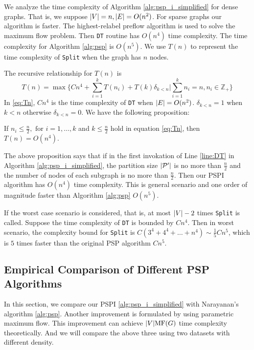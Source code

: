 We analyze the time complexity of Algorithm \ref{alg:psp_i_simplified} for dense graphs. That is, we suppose $\lvert V\rvert = n, \lvert E\rvert = O(n^2)$. For sparse graphs our algorithm is faster. The highest-relabel preflow algorithm is used to solve the maximum flow problem. Then \texttt{DT} routine has $O(n^4)$ time complexity. The time complexity for Algorithm \ref{alg:psp} is $O(n^5)$.
We use $T(n)$ to represent the time complexity of \texttt{Split} when the graph has $n$ nodes.

The recursive relationship for $T(n)$ is
\begin{equation}\label{eq:Tn}
T(n) = \max \{ C n^4 + \sum_{i=1}^k T(n_i) + T(k)\delta_{k<n} | \sum_{i=1}^k n_i = n, n_i \in \mathbb{Z}_{+} \}
\end{equation}	
In \eqref{eq:Tn}, $Cn^4$ is the time complexity of \texttt{DT} when $\lvert E\rvert = O(n^2)$. $\delta_{k<n} = 1$ when $k<n$ otherwise $\delta_{k<n}=0$. We have the following proposition:
\begin{proposition}\label{prop:alg_complexity}
	 If $n_i \leq \frac{n}{2}, \textrm{ for } i=1,\dots,k$ and $ k \leq \frac{n}{2}$  hold in equation \eqref{eq:Tn}, then $T(n) = O(n^4)$.
\end{proposition}

The above proposition says that if in the first invokation of Line \ref{line:DT} in Algorithm \ref{alg:psp_i_simplified}, the partition size $\lvert\mathcal{P}'\rvert$ is no more than $\frac{n}{2}$ and the number of nodes of each subgraph is no more than $\frac{n}{2}$. Then our PSPI algorithm has $O(n^4)$ time complexity. This is general scenario and one order of magnitude faster than Algorithm \ref{alg:psp} $O(n^5)$.

If the worst case scenario is considered, that is, at most $\lvert V\rvert-2$ times \texttt{Split} is called. Suppose the time complexity of \texttt{DT} is bounded by $Cn^4$. Then in worst scenario, the complexity bound for \texttt{Split} is $C(3^4+4^4 + \dots + n^4) \sim \frac{1}{5}Cn^5$, which is $5$ times faster than the original PSP algorithm $Cn^5$.
\subsection{Empirical Comparison of Different PSP Algorithms}
In this section, we compare our PSPI \ref{alg:psp_i_simplified} with Narayanan's algorithm \ref{alg:psp}.
Another improvement is formulated by \cite{kolmogorov} using parametric maximum flow.
This improvement can achieve $\lvert V\rvert \textrm{MF}(G)$ time complexity theoretically. And we will compare the above three using two datasets with different density.

